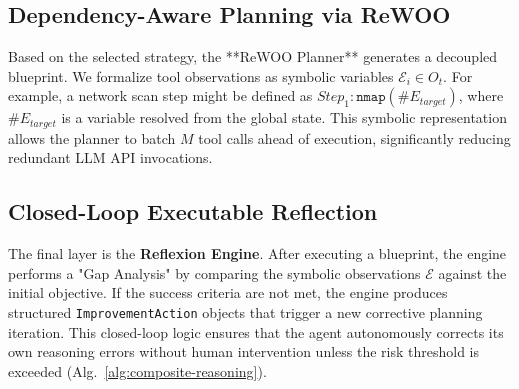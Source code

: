 \subsection{Dependency-Aware Planning via ReWOO}
Based on the selected strategy, the **ReWOO Planner** generates a decoupled blueprint. We formalize tool observations as symbolic variables $\mathcal{E}_i \in O_t$. For example, a network scan step might be defined as $Step_1: \texttt{nmap}(\#E_{target})$, where $\#E_{target}$ is a variable resolved from the global state. This symbolic representation allows the planner to batch $M$ tool calls ahead of execution, significantly reducing redundant LLM API invocations.

\subsection{Closed-Loop Executable Reflection}
The final layer is the \textbf{Reflexion Engine}. After executing a blueprint, the engine performs a "Gap Analysis" by comparing the symbolic observations $\mathcal{E}$ against the initial objective. If the success criteria are not met, the engine produces structured \texttt{ImprovementAction} objects that trigger a new corrective planning iteration. This closed-loop logic ensures that the agent autonomously corrects its own reasoning errors without human intervention unless the risk threshold is exceeded (Alg.~\ref{alg:composite-reasoning}).



